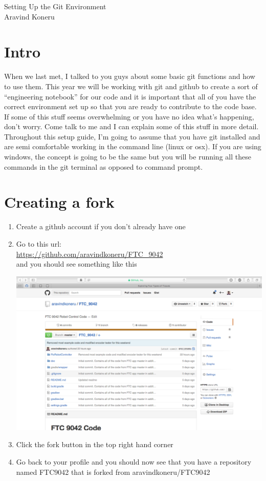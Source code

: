 \documentclass[11pt,fleqn]{article}
\theoremstyle{definition}
\begin{document}
\begin{center}
{\Huge
Setting Up the Git Environment
}\\
Aravind Koneru
\end{center}

\section*{Intro}

When we last met, I talked to you guys about some basic git functions and how to use them. This year
we will be working with git and github to create a sort of ``engineering notebook'' for our code and
it is important that all of you have the correct environment set up so that you are ready to
contribute to the code base. If some of this stuff seems overwhelming or you have no idea what's
happening, don't worry. Come talk to me and I can explain some of this stuff in more detail.
Throughout this setup guide, I'm going to assume that you have git installed and are semi
comfortable working in the command line (linux or osx). If you are using windows, the concept is
going to be the same but you will be running all these commands in the git terminal as opposed to
command prompt. 

\section*{Creating a fork}

\begin{enumerate}
\item
Create a github account if you don't already have one

\item
Go to this url:\\
\url{https://github.com/aravindkoneru/FTC_9042}\\
and you should see something like this

\begin{center}
\includegraphics[scale=.35]{fork}
\end{center}

\item
Click the fork button in the top right hand corner

\item
Go back to your profile and you should now see that you have a repository named FTC9042 that is
forked from aravindkoneru/FTC9042
\end{enumerate}
\end{document}

